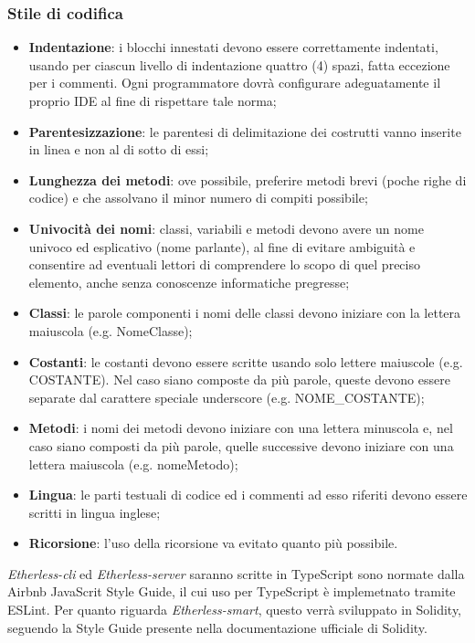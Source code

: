      	\subsubsection*{Stile di codifica}     
       \begin{itemize}
          	\item{\textbf{Indentazione}: i blocchi innestati devono essere correttamente indentati, usando per ciascun livello di indentazione quattro (4) spazi, fatta eccezione per i commenti. Ogni programmatore dovrà configurare adeguatamente il proprio IDE al fine di rispettare tale norma;}
			\item{\textbf{Parentesizzazione}: le parentesi di delimitazione dei costrutti vanno inserite in linea e non al di sotto di essi;}
			\item{\textbf{Lunghezza dei metodi}: ove possibile, preferire metodi brevi (poche righe di codice) e che assolvano il minor numero di compiti possibile;}
			\item{\textbf{Univocità dei nomi}: classi, variabili e metodi devono avere un nome univoco ed esplicativo (nome parlante), al fine di evitare ambiguità e consentire ad eventuali lettori di comprendere lo scopo di quel preciso elemento, anche senza conoscenze informatiche pregresse;}
			\item{\textbf{Classi}: le parole componenti i nomi delle classi devono iniziare con la lettera maiuscola (e.g. NomeClasse);}
			\item{\textbf{Costanti}: le costanti devono essere scritte usando solo lettere maiuscole (e.g. COSTANTE). Nel caso siano composte da più parole, queste devono essere separate dal carattere speciale underscore (e.g. NOME\_COSTANTE);}
			\item{\textbf{Metodi}: i nomi dei metodi devono iniziare con una lettera minuscola e, nel caso 	siano composti da più parole, quelle successive devono iniziare con una lettera maiuscola (e.g. nomeMetodo);}
			\item{\textbf{Lingua}: le parti testuali di codice ed i commenti ad esso riferiti devono essere scritti in lingua inglese;}
            \item{\textbf{Ricorsione}: l'uso della ricorsione va evitato quanto più possibile.}
		\end{itemize}
		
		\noindent\textit{Etherless-cli} ed \textit{Etherless-server} saranno scritte in TypeScript sono normate dalla Airbnb JavaScrit Style Guide, il cui uso per TypeScript è implemetnato tramite ESLint. 
		Per quanto riguarda \textit{Etherless-smart}, questo verrà sviluppato in Solidity, seguendo la Style Guide presente nella documentazione ufficiale di Solidity. 
		
